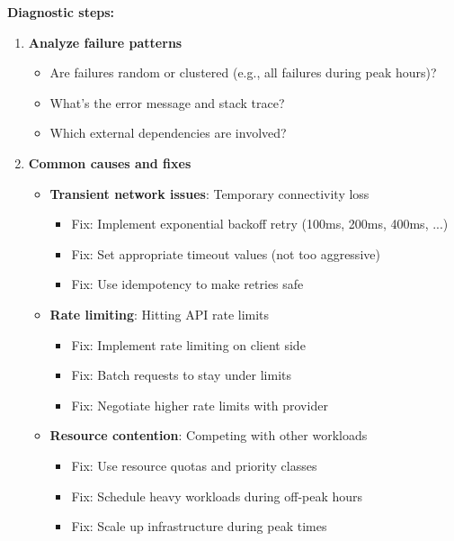\textbf{Diagnostic steps:}
\begin{enumerate}
    \item \textbf{Analyze failure patterns}
        \begin{itemize}
            \item Are failures random or clustered (e.g., all failures during peak hours)?
            \item What's the error message and stack trace?
            \item Which external dependencies are involved?
        \end{itemize}

    \item \textbf{Common causes and fixes}
        \begin{itemize}
            \item \textbf{Transient network issues}: Temporary connectivity loss
                \begin{itemize}
                    \item Fix: Implement exponential backoff retry (100ms, 200ms, 400ms, ...)
                    \item Fix: Set appropriate timeout values (not too aggressive)
                    \item Fix: Use idempotency to make retries safe
                \end{itemize}

            \item \textbf{Rate limiting}: Hitting API rate limits
                \begin{itemize}
                    \item Fix: Implement rate limiting on client side
                    \item Fix: Batch requests to stay under limits
                    \item Fix: Negotiate higher rate limits with provider
                \end{itemize}

            \item \textbf{Resource contention}: Competing with other workloads
                \begin{itemize}
                    \item Fix: Use resource quotas and priority classes
                    \item Fix: Schedule heavy workloads during off-peak hours
                    \item Fix: Scale up infrastructure during peak times
                \end{itemize}


\end{itemize}
\end{enumerate}
